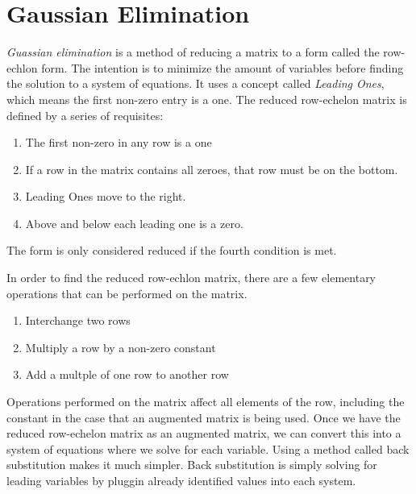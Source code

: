 \section{Gaussian Elimination} \label{gaussianelimination}
\emph{Guassian elimination} is a method of reducing a matrix to a form called the
row-echlon form. The intention is to minimize the amount of variables before
finding the solution to a system of equations. It uses a concept called \emph{Leading
Ones}, which means the first non-zero entry is a one. The reduced row-echelon
matrix is defined by a series of requisites:
\begin{enumerate}
    \item The first non-zero in any row is a one
    \item If a row in the matrix contains all zeroes, that row must be on the
        bottom.
    \item Leading Ones move to the right. 
    \item Above and below each leading one is a zero.
\end{enumerate}
The form is only considered reduced if the fourth condition is met.

In order to find the reduced row-echlon matrix, there are a few elementary
operations that can be performed on the matrix.
\begin{enumerate}
    \item Interchange two rows
    \item Multiply a row by a non-zero constant
    \item Add a multple of one row to another row
\end{enumerate}
Operations performed on the matrix affect all elements of the row, including the
constant in the case that an augmented matrix is being used.  Once we have the
reduced row-echelon matrix as an augmented matrix, we can convert this into a
system of equations where we solve for each variable. Using a method called back
substitution makes it much simpler. Back substitution is simply solving for
leading variables by pluggin already identified values into
each system.

